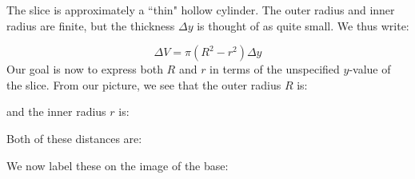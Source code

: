 \documentclass{ximera}
\begin{document}
The slice is approximately a ``thin" hollow cylinder.  The outer radius and inner radius are finite, but the thickness $\Delta y$ is thought of as quite small.  We thus write:

\[\Delta V = \pi(R^2-r^2) \Delta y \]
Our goal is now to express both $R$ and $r$ in terms of the unspecified $y$-value of the slice.  From our picture, we see that the outer radius $R$ is:

\begin{multipleChoice}
\end{multipleChoice}

and the inner radius $r$ is:

\begin{multipleChoice}
\end{multipleChoice}

Both of these distances are:

\begin{multipleChoice}
\end{multipleChoice}

We now label these on the image of the base:
\end{document}
